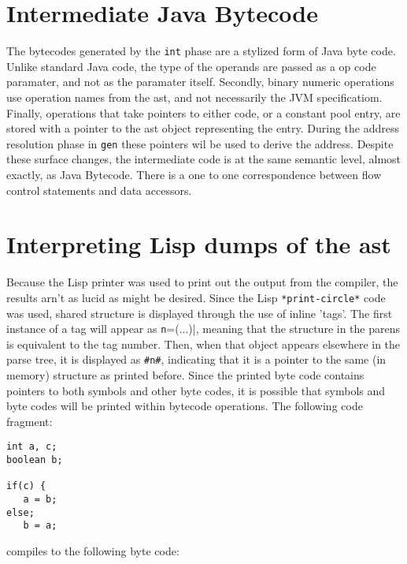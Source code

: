 \documentclass{article}[1994/05/24]
\begin{document}
\section{Intermediate Java Bytecode}

	The bytecodes generated by the \verb|int| phase are a stylized
form of Java byte code.  Unlike standard Java code, the type of the
operands are passed as a op code paramater, and not as the paramater
itself.  Secondly, binary numeric operations use operation names
from the ast, and not necessarily the JVM specificatiom.  Finally, 
operations that take pointers to either code, or a constant pool
entry, are stored with a pointer to the ast object representing the
entry.  During the address resolution phase in \verb|gen| these
pointers wil be used to derive the address. Despite these surface
changes, the intermediate code is at the same semantic level, almost
exactly, as Java Bytecode. There is a one to one correspondence between
flow control statements and data accessors.

\section{Interpreting Lisp dumps of the ast}

	Because the Lisp printer was used to print out the output
from the compiler, the results arn't as lucid as might be desired.
Since the Lisp \verb|*print-circle*| code was used, shared structure
is displayed through the use of inline 'tags'.  The first instance of
a tag will appear as \verb#n#=(...)|, meaning that the structure in the
parens is equivalent to the tag number.  Then, when that object appears
elsewhere in the parse tree, it is displayed as \verb|#n#|, indicating
that it is a pointer to the same (in memory) structure as printed before.
Since the printed byte code contains pointers to both symbols and other
byte codes, it is possible that symbols and byte codes will be printed
within bytecode operations.  The following code fragment:

\begin{verbatim}
int a, c;
boolean b;

if(c) {
   a = b;
else;
   b = a;
\end{verbatim}

compiles to the following byte code:
\end{document}

